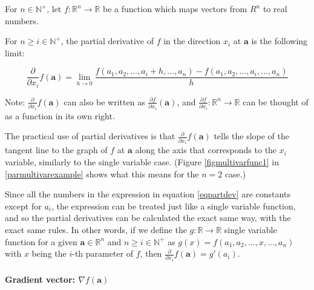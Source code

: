 \documentclass[titlepage]{article}
\begin{document}
          For $n \in \mathbb{N}^+$, let $f : \mathbb{R}^n \rightarrow \mathbb{R}$
          be a function which maps vectors from $R^n$ to real numbers.

          For $n \ge i \in \mathbb{N}^+$, the partial derivative of $f$ in the
          direction $x_i$ at $\mathbf{a}$ is the following limit:

          \begin{equation} \label{eqpartdev}
            \frac{\partial}{\partial x_i} f(\mathbf{a})
              = \lim_{h \to 0}
                  \frac{
                    f(a_1, a_2, \ldots, a_i + h, \ldots, a_n)
                    - f(a_1, a_2, \ldots, a_i, \ldots, a_n)
                  }{
                    h
                  }
          \end{equation}

          Note: $\frac{\partial}{\partial x_i} f(\mathbf{a})$ can also be
          written as $\frac{\partial f}{\partial x_i} (\mathbf{a})$, and
          $\frac{\partial f}{\partial x_i} : \mathbb{R}^n \rightarrow \mathbb{R}$
          can be thought of as a function in its own right.

          The practical use of partial derivatives is that
          $\frac{\partial}{\partial x_i} f(\mathbf{a})$ tells the slope
          of the tangent line to the graph of $f$ at $\mathbf{a}$ along the
          axis that corresponds to the $x_i$ variable, similarly to the single
          variable case. (Figure \ref{figmultivarfunc1} in
          \ref{parmultivarexample} shows what this means for the $n=2$ case.)

          Since all the numbers in the expression in equation \ref{eqpartdev}
          are constants except for $a_i$, the expression can be treated just
          like a single variable function, and so the partial derivatives can be
          calculated the exact same way, with the exact same rules. In other
          words, if we define the $g : \mathbb{R} \rightarrow \mathbb{R}$
          single variable function for a given $\mathbf{a} \in \mathbb{R}^n$ and
          $n \ge i \in \mathbb{N}^+$ as
          $g(x) = f(a_1, a_2, \ldots, x, \ldots, a_n)$ with $x$ being the $i$-th
          parameter of $f$, then
          $\frac{\partial}{\partial x_i} f(\mathbf{a}) = g'(a_i)$.

          \paragraph{Gradient vector: $\nabla f(\mathbf{a})$}
\end{document}
